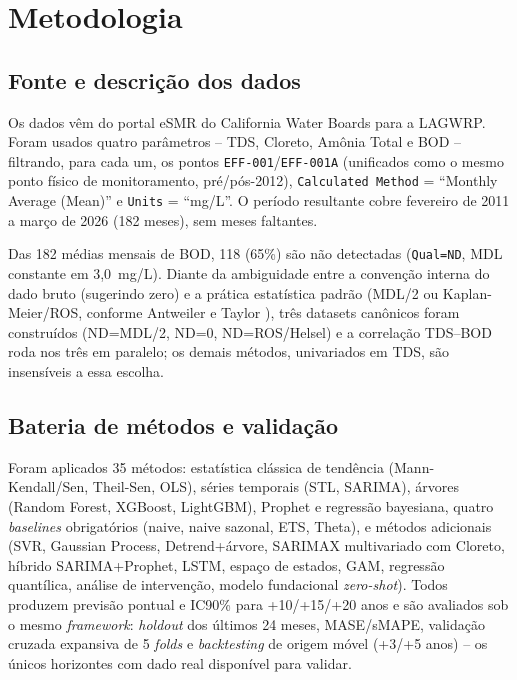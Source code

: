 \section{Metodologia}

\subsection{Fonte e descrição dos dados}

Os dados vêm do portal eSMR do California Water Boards para a LAGWRP. Foram usados quatro parâmetros -- TDS, Cloreto, Amônia Total e BOD -- filtrando, para cada um, os pontos \texttt{EFF-001}/\texttt{EFF-001A} (unificados como o mesmo ponto físico de monitoramento, pré/pós-2012), \texttt{Calculated Method} = ``Monthly Average (Mean)'' e \texttt{Units} = ``mg/L''. O período resultante cobre fevereiro de 2011 a março de 2026 (182 meses), sem meses faltantes.

Das 182 médias mensais de BOD, 118 (65\%) são não detectadas (\texttt{Qual=ND}, MDL constante em 3,0~mg/L). Diante da ambiguidade entre a convenção interna do dado bruto (sugerindo zero) e a prática estatística padrão (MDL/2 ou Kaplan-Meier/ROS, conforme Antweiler e Taylor \cite{antweiler2008evaluation}), três datasets canônicos foram construídos (ND=MDL/2, ND=0, ND=ROS/Helsel) e a correlação TDS--BOD roda nos três em paralelo; os demais métodos, univariados em TDS, são insensíveis a essa escolha.

\subsection{Bateria de métodos e validação}

Foram aplicados 35 métodos: estatística clássica de tendência (Mann-Kendall/Sen, Theil-Sen, OLS), séries temporais (STL, SARIMA), árvores (Random Forest, XGBoost, LightGBM), Prophet e regressão bayesiana, quatro \textit{baselines} obrigatórios (naive, naive sazonal, ETS, Theta), e métodos adicionais (SVR, Gaussian Process, Detrend+árvore, SARIMAX multivariado com Cloreto, híbrido SARIMA+Prophet, LSTM, espaço de estados, GAM, regressão quantílica, análise de intervenção, modelo fundacional \textit{zero-shot}). Todos produzem previsão pontual e IC90\% para +10/+15/+20 anos e são avaliados sob o mesmo \textit{framework}: \textit{holdout} dos últimos 24 meses, MASE/sMAPE, validação cruzada expansiva de 5 \textit{folds} e \textit{backtesting} de origem móvel (+3/+5 anos) -- os únicos horizontes com dado real disponível para validar.


